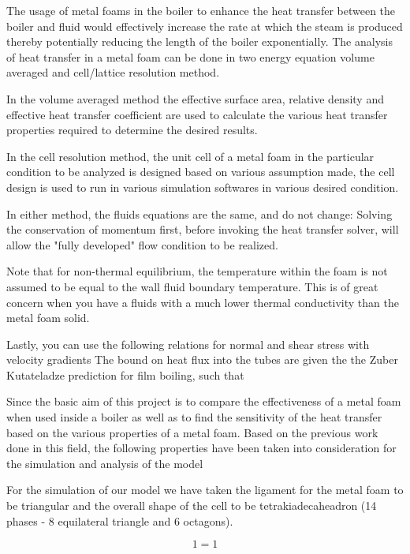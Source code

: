 \documentclass[asme2ejs.tex]{subfiles}
\begin{document}
The usage of metal foams in the boiler to enhance the heat transfer between the boiler and fluid  would effectively increase the rate at which the steam is produced thereby potentially reducing the length of the boiler exponentially. %
The analysis of heat transfer in a metal foam can be done in two energy equation volume averaged and cell/lattice resolution method.

In the volume averaged method the effective surface area, relative density and effective heat transfer coefficient  are used to calculate the various heat transfer properties required to determine the desired results. 

In the cell resolution method, the unit cell of a metal foam in the particular condition to be analyzed is designed based on various assumption made, the cell design is used to run in various simulation softwares in various desired condition.

In either method, the fluids equations are the same, and do not change:
Solving the conservation of momentum first, before invoking the heat transfer solver, will allow the "fully developed" flow condition to be realized.


Note that for non-thermal equilibrium, the temperature within the foam is not assumed to be equal to the wall fluid boundary temperature. This is of great concern when you have a fluids with a much lower thermal conductivity than the metal foam solid. 

Lastly, you can use the following relations for normal and shear stress with velocity gradients
The bound on heat flux into the tubes are given the the Zuber Kutateladze prediction for film boiling, such that 


Since the basic aim of this project is to compare the effectiveness of a metal foam when used inside a boiler as well as to find the sensitivity of the heat transfer based on the various properties of a metal foam. Based on the previous work done in this field, the following properties have been taken into consideration for the simulation and analysis of the model

For the simulation of our model we have taken the ligament for the metal foam to be triangular and the overall shape of the cell to be tetrakiadecaheadron (14 phases - 8 equilateral triangle and 6 octagons).

\begin{equation}
1=1
\end{equation}
\end{document}

